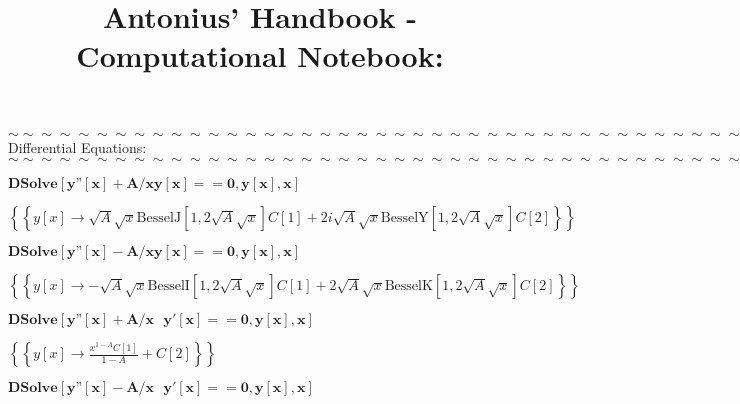 \documentclass{article}
\begin{document}
\title{Antonius{'} Handbook - Computational Notebook:}
\author{}
\date{}
\maketitle

$\sim \sim \sim \sim \sim \sim \sim \sim \sim \sim \sim \sim \sim \sim \sim \sim \sim \sim \sim \sim \sim \sim \sim \sim \sim \sim \sim \sim \sim
\sim \sim \sim \sim \sim \sim \sim \sim \sim \sim \sim \sim $\\
Differential Equations:\\
$\sim \sim \sim \sim \sim \sim \sim \sim \sim \sim \sim \sim \sim \sim \sim \sim \sim \sim \sim \sim \sim \sim \sim \sim \sim \sim \sim \sim \sim
\sim \sim \sim \sim \sim \sim \sim \sim \sim \sim \sim \sim $

\begin{doublespace}
\noindent\(\pmb{\text{DSolve}[y\text{''}[x]+A/x y[x]==0,y[x],x]}\)
\end{doublespace}

\begin{doublespace}
\noindent\(\left\{\left\{y[x]\to \sqrt{A} \sqrt{x} \text{BesselJ}\left[1,2 \sqrt{A} \sqrt{x}\right] C[1]+2 i \sqrt{A} \sqrt{x} \text{BesselY}\left[1,2
\sqrt{A} \sqrt{x}\right] C[2]\right\}\right\}\)
\end{doublespace}

\begin{doublespace}
\noindent\(\pmb{\text{DSolve}[y\text{''}[x]-A/x y[x]==0,y[x],x]}\)
\end{doublespace}

\begin{doublespace}
\noindent\(\left\{\left\{y[x]\to -\sqrt{A} \sqrt{x} \text{BesselI}\left[1,2 \sqrt{A} \sqrt{x}\right] C[1]+2 \sqrt{A} \sqrt{x} \text{BesselK}\left[1,2
\sqrt{A} \sqrt{x}\right] C[2]\right\}\right\}\)
\end{doublespace}

\begin{doublespace}
\noindent\(\pmb{\text{DSolve}[y\text{''}[x]+ A/x\text{  }y'[x]==0,y[x],x]}\)
\end{doublespace}

\begin{doublespace}
\noindent\(\left\{\left\{y[x]\to \frac{x^{1-A} C[1]}{1-A}+C[2]\right\}\right\}\)
\end{doublespace}

\begin{doublespace}
\noindent\(\pmb{\text{DSolve}[y\text{''}[x]- A/x\text{  }y'[x]==0,y[x],x]}\)
\end{doublespace}
\end{document}
